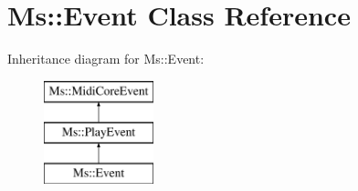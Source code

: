 \hypertarget{class_ms_1_1_event}{}\section{Ms\+:\+:Event Class Reference}
\label{class_ms_1_1_event}
Inheritance diagram for Ms\+:\+:Event\+:\begin{figure}[H]
\begin{center}
\leavevmode
\includegraphics[height=3.000000cm]{class_ms_1_1_event}
\end{center}
\end{figure}
